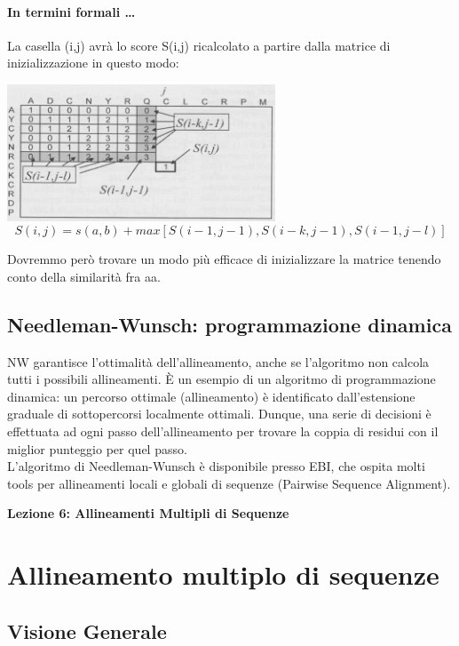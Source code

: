 \documentclass{article}
\begin{document}
\paragraph{In termini formali \dots} La casella (i,j) avrà lo score S(i,j)
ricalcolato a partire dalla matrice di inizializzazione in questo
modo:
\begin{center}
    \includegraphics[width=0.6\textwidth]{figures/otto.png}
    $$ S(i,j) = {s(a,b) + max[S(i-1,j-1),S(i-k,j-1),S(i-1,j-l)]}$$
\end{center}
Dovremmo però trovare un modo più efficace di inizializzare la
matrice tenendo conto della similarità fra aa.
\subsection{Needleman-Wunsch: programmazione dinamica}
NW garantisce l’ottimalità dell’allineamento, anche se l'algoritmo non
calcola tutti i possibili allineamenti.
È un esempio di un algoritmo di programmazione dinamica:
un percorso ottimale (allineamento) è identificato dall’estensione
graduale di sottopercorsi localmente ottimali.
Dunque, una serie di decisioni è effettuata ad ogni passo
dell’allineamento per trovare la coppia di residui con il miglior
punteggio per quel passo.\\
L’algoritmo di Needleman-Wunsch è disponibile presso
EBI, che ospita molti tools per allineamenti locali e globali di
sequenze (Pairwise Sequence Alignment).

\begin{titlepage}
    \begin{center}
        \vspace*{1cm}
        \LARGE
        \textbf{Lezione 6: Allineamenti Multipli di Sequenze}

    \end{center}
\end{titlepage}
\section{Allineamento multiplo di sequenze}
\subsection{Visione Generale}
\end{document}
